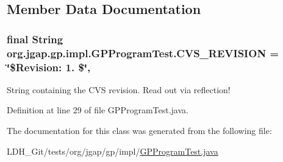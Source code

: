 \subsection{Member Data Documentation}
\hypertarget{classorg_1_1jgap_1_1gp_1_1impl_1_1_g_p_program_test_aa2739f9d80a246bae986170d45076246}{
\subsubsection[{C\-V\-S\-\_\-\-R\-E\-V\-I\-S\-I\-O\-N}]{\setlength{\rightskip}{0pt plus 5cm}final String org.\-jgap.\-gp.\-impl.\-G\-P\-Program\-Test.\-C\-V\-S\-\_\-\-R\-E\-V\-I\-S\-I\-O\-N = \char`\"{}\$Revision\-: 1. \$\char`\"{}\hspace{0.3cm}{\ttfamily [static]}, {\ttfamily [private]}}}\label{classorg_1_1jgap_1_1gp_1_1impl_1_1_g_p_program_test_aa2739f9d80a246bae986170d45076246}
String containing the C\-V\-S revision. Read out via reflection! 

Definition at line 29 of file G\-P\-Program\-Test.\-java.



The documentation for this class was generated from the following file\-:\begin{DoxyCompactItemize}
\item 
L\-D\-H\-\_\-\-Git/tests/org/jgap/gp/impl/\hyperlink{_g_p_program_test_8java}{G\-P\-Program\-Test.\-java}\end{DoxyCompactItemize}
